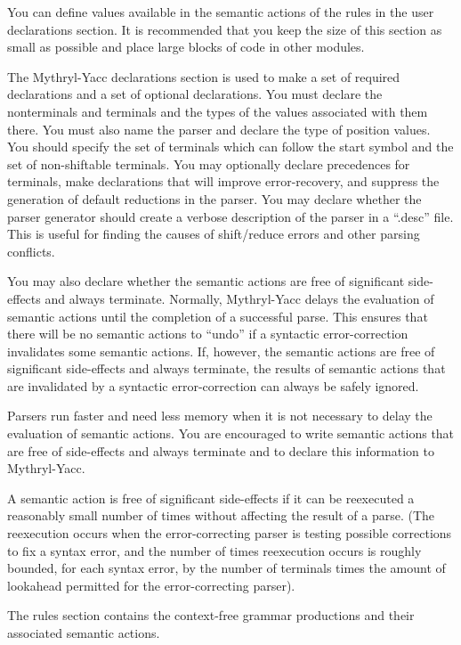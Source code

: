 You can define values available in the semantic
actions of the rules in the user declarations section.
It is recommended that you keep the size of this
section as small as possible and place large
blocks of code in other modules.

The Mythryl-Yacc declarations section is used to make a set
of required declarations and a set of optional declarations.
You must declare the nonterminals and terminals and the
types of the values associated with them there.  You must
also name the parser and declare the type of position values.
You should specify the set of terminals which can follow
the start symbol and the set of non-shiftable terminals.
You may optionally declare precedences for terminals,
make declarations that will
improve error-recovery, and suppress the generation of
default reductions in the parser.  You may 
declare whether the parser generator should create
a verbose description of the parser in a ``.desc'' file.  This is useful
for finding the causes of shift/reduce errors and other parsing conflicts.

You may also declare whether the semantic actions are
free of significant side-effects and always terminate.  Normally, Mythryl-Yacc
delays the evaluation of semantic actions until the completion of a
successful parse.  This ensures that there will be no semantic actions
to ``undo'' if a syntactic error-correction invalidates some semantic
actions.  If, however, the semantic actions are free of significant
side-effects and always terminate, the results of semantic actions that
are invalidated by a syntactic error-correction can always be safely
ignored.

Parsers run faster and need less memory when it is not
necessary to delay the evaluation of semantic actions.  You are
encouraged to write semantic actions that are free of side-effects and
always terminate and to declare this information to Mythryl-Yacc.

A semantic action is free of significant side-effects if it can be reexecuted
a reasonably small number of times without affecting the result of a
parse.  (The reexecution occurs when the error-correcting parser is testing
possible corrections to fix a syntax error, and the number of times
reexecution occurs is roughly bounded, for each syntax error, by the number of
terminals times the amount of lookahead permitted for the error-correcting
parser).

The rules section contains the context-free grammar productions and their
associated semantic actions.

